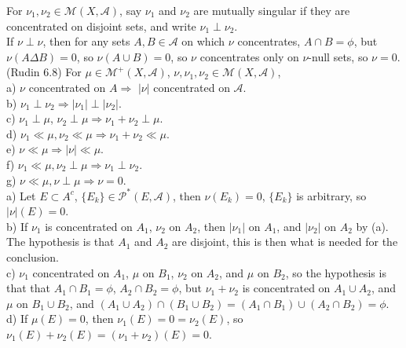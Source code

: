 \documentclass[12pt]{article}
\newcommand{\partset}[1]{ \mathcal{P}^{*}(#1) }
\newcommand{\A}[0] { \mathcal{A} }
\newcommand{\M}[0] { \mathcal{M} }
\newcommand{\rimply}[0] { \Rightarrow }
\begin{document}
For $\nu_1, \nu_2 \in \M(X, \A)$, say $\nu_1$ and $\nu_2$ are mutually singular if they are concentrated on disjoint sets, and write $\nu_1 \perp \nu_2$. \\

\noindent
If $\nu \perp \nu$, then for any sets $A,B \in \A$ on which $\nu$ concentrates, $A \cap B = \phi$, but $\nu(A \Delta B) = 0$, so $\nu(A \cup B) = 0$, so $\nu$ concentrates only on $\nu$-null sets, so $\nu=0$. \\


(Rudin 6.8) For $\mu \in \M^+(X, \A)$, $\nu,\nu_1,\nu_2 \in \M(X, \A)$, \\

\noindent
a) $\nu$ concentrated on $A \rimply$ $|\nu|$ concentrated on $\A$. \\
b) $\nu_1 \perp \nu_2 \rimply |\nu_1| \perp |\nu_2|$. \\
c) $\nu_1 \perp \mu$, $\nu_2 \perp \mu \rimply \nu_1 + \nu_2 \perp \mu$. \\
d) $\nu_1 \ll \mu, \nu_2 \ll \mu \rimply \nu_1 + \nu_2 \ll \mu$. \\
e) $\nu \ll \mu \rimply |\nu| \ll \mu$. \\
f) $\nu_1 \ll \mu, \nu_2 \perp \mu \rimply \nu_1 \perp \nu_2$. \\
g) $\nu \ll \mu, \nu \perp \mu \rimply \nu = 0$. \\

\noindent
a) Let $E \subset A^c$, $\{ E_k \} \in \partset{E, \A}$, then $\nu(E_k) = 0$, $\{E_k\}$ is arbitrary, so $|\nu|(E) = 0$. \\

\noindent
b) If $\nu_1$ is concentrated on $A_1$, $\nu_2$ on $A_2$, then $|\nu_1|$ on $A_1$, and $|\nu_2|$ on $A_2$ by (a). The hypothesis is that $A_1$ and $A_2$ are disjoint, this is then what is needed for the conclusion. \\

\noindent
c) $\nu_1$ concentrated on $A_1$, $\mu$ on $B_1$, $\nu_2$ on $A_2$, and $\mu$ on $B_2$, so the hypothesis is that that $A_1 \cap B_1 = \phi$, $A_2 \cap B_2 = \phi$, but $\nu_1 + \nu_2$ is concentrated on $A_1 \cup A_2$, and $\mu$  on $B_1 \cup B_2$, and $(A_1 \cup A_2) \cap (B_1 \cup B_2) = (A_1 \cap B_1) \cup (A_2 \cap B_2) = \phi$. \\

\noindent
d) If $\mu(E) = 0$, then $\nu_1(E) = 0 = \nu_2(E)$, so $\nu_1(E) + \nu_2(E) = (\nu_1 + \nu_2)(E) = 0$.\\
\end{document}

